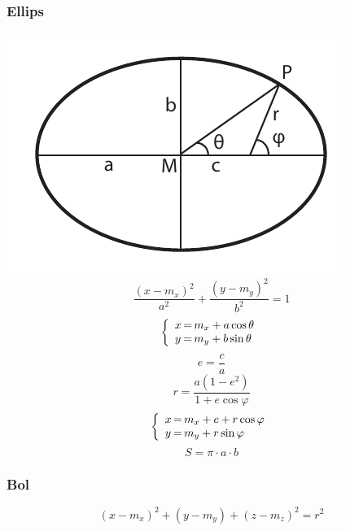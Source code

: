   \subsubsection{Ellips}
  \label{sec:vglEllips}
      \includegraphics{Figuren/Ellips.pdf}
    \[
      \frac{\left(x-m_x\right)^2}{a^2} + \frac{\left(y-m_y\right)^2}{b^2} = 1
    \]
    \[
      \left\{
        \begin{array}[h]{l@{\,=\,}l}
          x & m_x + a \cos \theta\\
          y & m_y + b \sin \theta\\
        \end{array}
      \right.
    \]
    \[
      e = \frac{c}{a}
    \]
    \[
      r = \frac{a \left( 1 - e^2 \right)}{1 + e \cos \varphi}
    \]
    \[
      \left\{
        \begin{array}[h]{l@{\,=\,}l}
          x & m_x + c + r \cos \varphi\\
          y & m_y     + r \sin \varphi\\
        \end{array}
      \right.
    \]
    \[
      S = \pi \cdot a \cdot b
    \]

  \subsubsection{Bol}
  \label{sec:vglBol}
    \[
      \left(x - m_x \right)^2 + \left(y - m_y\right) + \left( z - m_z\right)^2 = r^2
    \]









